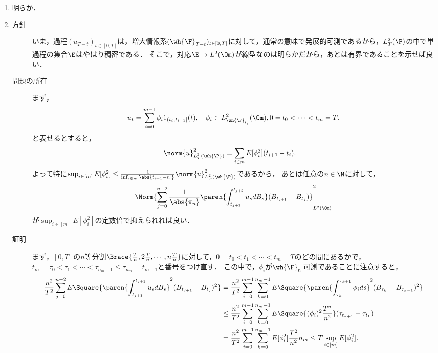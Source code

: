 \documentclass[uplatex,dvipdfmx]{jsreport}
\begin{document}
\begin{Proof}\mbox{}
    \begin{enumerate}
        \item 明らか．
        \item \begin{description}
            \item[方針] いま，過程$(u_{T-t})_{t\in[0,T]}$は，増大情報系$(\wh{\F}_{T-t})_{t\in[0,T]}$に対して，通常の意味で発展的可測であるから，$L^2_T(\P)$の中で単過程の集合$\E$はやはり稠密である．
            そこで，対応$\E\to L^2(\Om)$が線型なのは明らかだから，あとは有界であることを示せば良い．
            \item[問題の所在] まず，
            \[u_t=\sum_{i=0}^{m-1}\phi_i1_{(t_i,t_{i+1}]}(t),\quad\phi_i\in L^2_{\wh{\F}_{t_i}}(\Om),0=t_0<\cdots<t_m=T.\]
            と表せるとすると，
            \begin{align*}
                \norm{u}_{L^2_T(\wh{\P})}^2&=\sum_{i\in m}E[\phi_i^2](t_{i+1}-t_i).
            \end{align*}
            よって特に$\sup_{i\in[m]}E[\phi_i^2]\le\frac{1}{\inf_{i\in m}\abs{t_{i+1}-t_i}}\norm{u}_{L^2_T(\wh{\P})}^2$であるから，
            あとは任意の$n\in\N$に対して，
            \[\Norm{\sum_{j=0}^{n-2}\frac{1}{\abs{\pi_n}}\paren{\int^{t_{j+2}}_{t_{j+1}}u_sdB_s}(B_{t_{j+1}}-B_{t_j})}_{L^2(\Om)}^2\]
            が$\sup_{i\in[m]}E[\phi^2_i]$の定数倍で抑えられれば良い．
            \item[証明] まず，$[0,T]$の$n$等分割$\Brace{\frac{T}{n},2\frac{T}{n},\cdots,n\frac{T}{n}}$に対して，$0=t_0<t_1<\cdots<t_m=T$のどの間にあるかで，$t_m=\tau_{0}<\tau_1<\cdots<\tau_{n_m-1}\le\tau_{n_m}=t_{m+1}$と番号をつけ直す．
            この中で，$\phi_i$が$\wh{\F}_{t_i}$可測であることに注意すると，
            \begin{align*}
                \frac{n^2}{T^2}\sum_{j=0}^{n-2}E\Square{\paren{\int^{t_{j+2}}_{t_{j+1}}u_sdB_s}^2(B_{t_{j+1}}-B_{t_j})^2}&=\frac{n^2}{T^2}\sum_{i=0}^{m-1}\sum_{k=0}^{n_m-1}E\Square{\paren{\int^{\tau_{k+1}}_{\tau_k}\phi_ids}^2(B_{\tau_k}-B_{\tau_{k-1}})^2}\\
                &\le\frac{n^2}{T^2}\sum_{i=0}^{m-1}\sum_{k=0}^{n_m-1}E\Square{(\phi_i)^2\frac{T^n}{n^2}}(\tau_{t_{k+1}}-\tau_{t_k})\\
                &=\frac{n^2}{T^2}\sum_{i=0}^{m-1}\sum_{k=0}^{n_m-1}E[\phi^2_i]\frac{T^2}{n^2}n_m\le T\sup_{i\in[m]}E[\phi^2_i].
            \end{align*}
        \end{description}

\end{enumerate}
\end{Proof}
\end{document}

